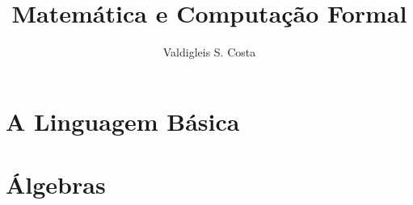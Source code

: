 \documentclass[b5paper,10pt]{book}
\title{Matemática e Computação Formal}
\author{Valdigleis S. Costa}
\begin{document}
	
	\frontmatter

	
		
	
	
	\tableofcontents
	
	\mainmatter
	
	\part{A Linguagem Básica}
		
	
	
	
	
	
	

	\part{Álgebras}
	

\end{document}
